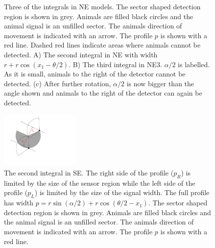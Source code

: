 \begin{figure}[t]
  \centering
{
}
\caption[Three of the integrals in NE models]{
Three of the integrals in NE models.
The sector shaped detection region is shown in grey.
Animals are filled black circles and the animal signal is an unfilled sector.
The animals direction of movement is indicated with an arrow.
The profile $p$ is shown with a red line.
Dashed red lines indicate areas where animals cannot be detected.
A) The second integral in NE with width $r + r\cos(x_1 - \theta/2)$.
B) The third integral in NE3.
$\alpha/2$ is labelled.
As it is small, animals to the right of the detector cannot be detected.
(c) After further rotation, $\alpha/2$ is now bigger than the angle shown and animals to the right of the detector can again be detected.
}
\label{fig:NE}
\end{figure}


\begin{figure}[t]
        \centering
        \includegraphics[width=0.35\textwidth, trim=1cm 4cm 9cm 1cm]{imgs/se3.pdf}
\caption[The second integral in SE]{The second integral in SE.
The right side of the profile ($p_R$) is limited by the size of the sensor region  while the left side of the profile ($p_L$) is limited by the size of the signal width.
The full profile has width $p = r\sin(\alpha/2) +r\cos(\theta/2-x_1)$.
The sector shaped detection region is shown in grey.
Animals are filled black circles and the animal signal is an unfilled sector.
The animals direction of movement is indicated with an arrow.
The profile $p$ is shown with a red line.
  }
\label{fig:se3}
\end{figure}

